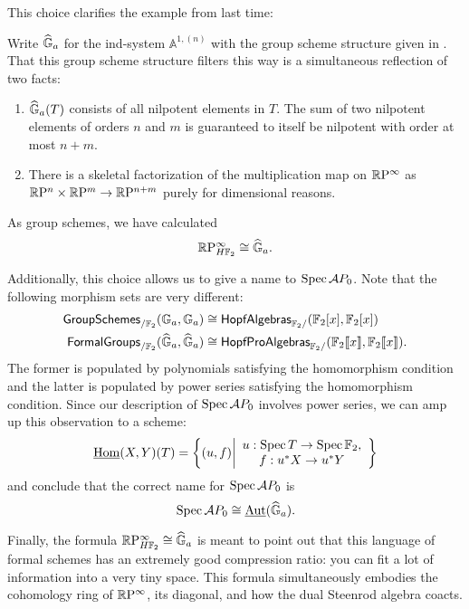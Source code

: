 This choice clarifies the example from last time:
\begin{example}\label{RPinftyExampleForReal}
Write $\widehat{\mathbb G}_a$ for the ind-system $\mathbb A^{1, (n)}$ with the group scheme structure given in .  That this group scheme structure filters this way is a simultaneous reflection of two facts:
\begin{enumerate}
\item $\widehat{\mathbb G}_a(T)$ consists of all nilpotent elements in $T$.  The sum of two nilpotent elements of orders $n$ and $m$ is guaranteed to itself be nilpotent with order at most $n+m$.
\item There is a skeletal factorization of the multiplication map on $\mathbb R\mathrm P^\infty$ as $\mathbb R\mathrm P^n \times \mathbb R\mathrm P^m \to \mathbb R\mathrm P^{n+m}$ purely for dimensional reasons.
\end{enumerate}
As group schemes, we have calculated \[\mathbb R\mathrm P^\infty_{H\mathbb F_2} \cong \widehat{\mathbb G}_a.\]
\end{example}

Additionally, this choice allows us to give a name to $\operatorname{Spec} \mathcal AP_0$.  Note that the following morphism sets are very different:
\begin{align*}
\mathsf{GroupSchemes}_{/\mathbb F_2}(\mathbb G_a, \mathbb G_a) & \cong \mathsf{HopfAlgebras}_{\mathbb F_2/}(\mathbb F_2[x], \mathbb F_2[x]) \\
\mathsf{FormalGroups}_{/\mathbb F_2}(\widehat{\mathbb G}_a, \widehat{\mathbb G}_a) & \cong \mathsf{HopfProAlgebras}_{\mathbb F_2/}(\mathbb F_2\llbracket x \rrbracket, \mathbb F_2\llbracket x \rrbracket).
\end{align*}
The former is populated by polynomials satisfying the homomorphism condition and the latter is populated by power series satisfying the homomorphism condition.  Since our description of $\operatorname{Spec} \mathcal AP_0$ involves power series, we can amp up this observation to a scheme: \[\underline{\operatorname{Hom}}(X, Y)(T) = \left\{ (u, f) \middle| \begin{array}{c} u: \operatorname{Spec} T \to \operatorname{Spec} \mathbb F_2, \\ f: u^* X \to u^* Y \end{array}\right\}\] and conclude that the correct name for $\operatorname{Spec} \mathcal AP_0$ is \[\operatorname{Spec} \mathcal AP_0 \cong \underline{\operatorname{Aut}}(\widehat{\mathbb G}_a).\]

Finally, the formula $\mathbb R\mathrm P^\infty_{H\mathbb F_2} \cong \widehat{\mathbb G}_a$ is meant to point out that this language of formal schemes has an extremely good compression ratio: you can fit a lot of information into a very tiny space.  This formula simultaneously embodies the cohomology ring of $\mathbb R\mathrm P^\infty$, its diagonal, and how the dual Steenrod algebra coacts.


